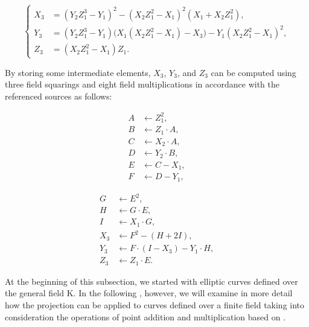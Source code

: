 \begin{equation}
	\left\{
	\begin{aligned}
		X_3 &= (Y_2 Z_1^3 - Y_1)^2 - (X_2 Z_1^2 - X_1)^2 (X_1 + X_2 Z_1^2), \\
		Y_3 &= (Y_2 Z_1^3 - Y_1)\bigl(X_1 (X_2 Z_1^2 - X_1) - X_3\bigr) - Y_1 (X_2 Z_1^2 - X_1)^2, \\
		Z_3 &= (X_2 Z_1^2 - X_1) Z_1.
	\end{aligned}
	\right.
	\label{mixednotationdenomelimination}
\end{equation}

By storing some intermediate elements, $X_3$, $Y_3$, and $Z_3$ can be computed
using three field squarings and eight field multiplications in accordance with the referenced sources as follows:

\noindent
\begin{minipage}[t]{0.48\textwidth}
	\[
	\begin{aligned}
		A &\leftarrow Z_1^2, \\
		B &\leftarrow Z_1 \cdot A, \\
		C &\leftarrow X_2 \cdot A, \\
		D &\leftarrow Y_2 \cdot B, \\
		E &\leftarrow C - X_1, \\
		F &\leftarrow D - Y_1,
	\end{aligned}
	\]
\end{minipage}
\hfill
\begin{minipage}[t]{0.48\textwidth}
	\[
	\begin{aligned}
		G &\leftarrow E^2, \\
		H &\leftarrow G \cdot E, \\
		I &\leftarrow X_1 \cdot G, \\
		X_3 &\leftarrow F^2 - (H + 2I), \\
		Y_3 &\leftarrow F \cdot (I - X_3) - Y_1 \cdot H, \\
		Z_3 &\leftarrow Z_1 \cdot E.
	\end{aligned}
	\]
\end{minipage}




\quad

At the beginning of this subsection, we started with elliptic curves defined over the general field K. In the following , however, we will examine in more detail how the projection can be applied to curves defined over a finite field taking into consideration the operations of point addition and multiplication based on \cite{menezes2004ECC, theory.pairings.for.beginners}.


